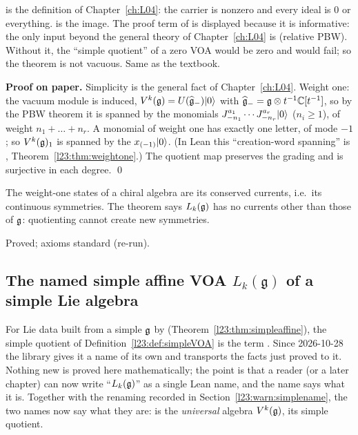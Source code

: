 \begin{dictionary}
 is the definition of Chapter~\ref{ch:L04}: the carrier is nonzero and every ideal is $0$ or everything.
 is the image. The proof term of  is displayed because it is informative: the
only input beyond the general theory of Chapter~\ref{ch:L04} is  (relative PBW). Without it, the
``simple quotient'' of a zero VOA would be zero and  would fail; so the theorem is not vacuous.
Same as the textbook.
\end{dictionary}

\textbf{Proof on paper.} Simplicity is the general fact of Chapter~\ref{ch:L04}. Weight one: the vacuum module is induced,
$V^k(\mathfrak g)=U(\widehat{\mathfrak g}_-)|0\rangle$ with $\widehat{\mathfrak g}_-=\mathfrak g\otimes t^{-1}{\mathbb{C}}[t^{-1}]$, so by the PBW theorem it is
spanned by the monomials $J^{a_1}_{-n_1}\cdots J^{a_r}_{-n_r}|0\rangle$ ($n_i\ge1$), of weight $n_1+\dots+n_r$. A monomial of weight one
has exactly one letter, of mode $-1$; so $V^k(\mathfrak g)_1$ is spanned by the $x_{(-1)}|0\rangle$. (In Lean this ``creation-word spanning''
is , Theorem~\ref{l23:thm:weightone}.) The quotient map preserves the grading and is surjective in each
degree. \qed

\begin{physics}
The weight-one states of a chiral algebra are its conserved currents, i.e.\ its continuous symmetries. The theorem says
$L_k(\mathfrak g)$ has no currents other than those of $\mathfrak g$: quotienting cannot create new symmetries.
\end{physics}

\begin{status}
Proved; axioms standard (re-run).
\end{status}

\subsection{The named simple affine VOA \texorpdfstring{$L_k(\mathfrak g)$}{L\_k(g)} of a simple Lie algebra}\label{l23:sec:simplename}

For Lie data built from a simple $\mathfrak g$ by  (Theorem~\ref{l23:thm:simpleaffine}), the simple quotient of
Definition~\ref{l23:def:simpleVOA} is the term . Since 2026-10-28 the library gives it a name of its own and transports the facts just proved to it. Nothing new is proved here
mathematically; the point is that a reader (or a later chapter) can now write ``$L_k(\mathfrak g)$'' as a single Lean name, and the name
says what it is. Together with the renaming recorded in Section~\ref{l23:warn:simplename}, the two names now say what they are:
 is the \emph{universal} algebra $V^k(\mathfrak g)$,  its simple quotient.


